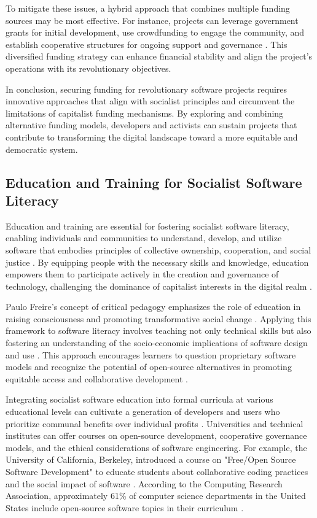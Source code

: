 \begin{refsection}
To mitigate these issues, a hybrid approach that combines multiple funding sources may be most effective. For instance, projects can leverage government grants for initial development, use crowdfunding to engage the community, and establish cooperative structures for ongoing support and governance \cite[pp.~120-122]{Scholz2016}. This diversified funding strategy can enhance financial stability and align the project's operations with its revolutionary objectives.

In conclusion, securing funding for revolutionary software projects requires innovative approaches that align with socialist principles and circumvent the limitations of capitalist funding mechanisms. By exploring and combining alternative funding models, developers and activists can sustain projects that contribute to transforming the digital landscape toward a more equitable and democratic system.

\subsection{Education and Training for Socialist Software Literacy}

Education and training are essential for fostering socialist software literacy, enabling individuals and communities to understand, develop, and utilize software that embodies principles of collective ownership, cooperation, and social justice \cite[pp.~68-69]{Freire2021}. By equipping people with the necessary skills and knowledge, education empowers them to participate actively in the creation and governance of technology, challenging the dominance of capitalist interests in the digital realm \cite[pp.~85-88]{Fuchs2017}.

Paulo Freire's concept of critical pedagogy emphasizes the role of education in raising consciousness and promoting transformative social change \cite[pp.~79-80]{Freire2021}. Applying this framework to software literacy involves teaching not only technical skills but also fostering an understanding of the socio-economic implications of software design and use \cite[pp.~102-105]{Eubanks2019}. This approach encourages learners to question proprietary software models and recognize the potential of open-source alternatives in promoting equitable access and collaborative development \cite[pp.~120-122]{McChesney2015}.

Integrating socialist software education into formal curricula at various educational levels can cultivate a generation of developers and users who prioritize communal benefits over individual profits \cite[pp.~29-30]{Lave1991}. Universities and technical institutes can offer courses on open-source development, cooperative governance models, and the ethical considerations of software engineering. For example, the University of California, Berkeley, introduced a course on "Free/Open Source Software Development" to educate students about collaborative coding practices and the social impact of software \cite[pp.~85-88]{Weber2005}. According to the Computing Research Association, approximately 61\% of computer science departments in the United States include open-source software topics in their curriculum \cite[pp.~45-47]{Zweben2015}.


\end{refsection}
